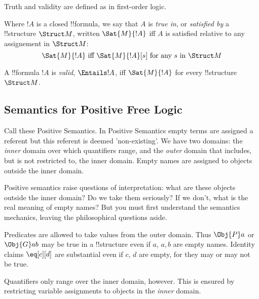 \documentclass[../../../../include/open-logic-section]{subfiles}
\begin{document}
Truth and validity are defined as in first-order logic.
    
\begin{defn}[Truth]
Where $!A$ is a closed !!{formula}, we say that $A$ is \emph{true in}, or
\emph{satisfied by} a !!{structure} $\Struct M$, written $\Sat{M}{!A}$ iff 
$A$ is satisfied relative to any assignement in $\Struct M$:
$$\Sat{M}{!A}\textrm{ iff }\Sat{M}{!A}[s]\textrm{ for any }s\textrm{ in }\Struct M$$
\end{defn}

\begin{defn}[Validity]
    A !!{formula} $!A$ is \emph{valid}, $\Entails !A$, iff $\Sat{M}{!A}$ for every
    !!{structure}~$\Struct M$.
\end{defn}

\subsection{Semantics for Positive Free Logic}

Call these Positive Semantics. In Positive Semantics empty terms are 
assigned a referent but this referent is deemed 'non-existing'. 
We have two domains: the \emph{inner} domain over which quantifiers
range, and the \emph{outer} domain that includes, but is not restricted
to, the inner domain. Empty names are assigned to objects outside the 
inner domain. 

Positive semantics raise questions of interpretation: what are these
objects outside the inner domain? Do we take them seriously? If we 
don't, what is the real meaning of empty names? But you must first 
understand the semantics mechanics, leaving the philosophical questions 
aside. 

Predicates are allowed to take values from the outer domain. Thus
$\Obj{P}a$ or $\Obj{G}ab$ may be true in a !!{structure} even if $a$,
$a,b$ are empty names. Identity claims $\eq[c][d]$ are substantial
even if $c$, $d$ are empty, for they may or may not be true. 

Quantifiers only range over the inner domain, however. This is ensured
by restricting variable assignments to objects in the \emph{inner}
domain.
\end{document}
